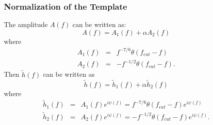 \subsubsection*{Normalization of the Template}
\label{NormOfTemplate}

The amplitude $A(f)$ can be written as:
\begin{equation}
A(f) = A_1(f) + \alpha A_2(f)
\end{equation}
where
\begin{eqnarray}
A_1(f) &=& f^{-7/6} \theta(f_{cut}-f) \\
A_2(f) &=& - f^{-1/2} \theta(f_{cut}-f).
\end{eqnarray}
Then $\tilde{h}(f)$ can be written as
\begin{equation}
\tilde{h}(f) = \tilde{h}_1(f) + \alpha \tilde{h}_2(f)
\end{equation}
where
\begin{eqnarray}
\tilde{h}_1(f) &=& A_1(f) e^{i \psi(f)} = f^{-7/6} \theta(f_{cut}-f)
e^{i \psi(f)} \\
\tilde{h}_2(f) &=& A_2(f) e^{i \psi(f)} = - f^{-1/2} \theta(f_{cut}-f)
e^{i \psi(f)}.
\end{eqnarray}


